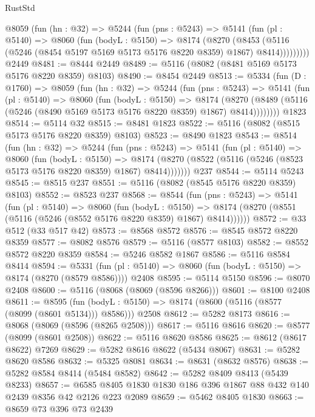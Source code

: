 \begin{lexlean}{RustStd}
\begin{coremodule}
{\begin{coremodule}
{{{{{{{{{{{{{{{{{{{{{{{{{{{{{{{      @8059
        (fun (hn : @32) =>
        @5244
          (fun (pns : @5243) =>
          @5141
            (fun (pl : @5140) =>
            @8060
              (fun (bodyL : @5150) =>
              @8174
                (@8270
                  (@8453
                    (@5116 (@5246 (@8454 @5197 @5169 @5173 @5176 @8220 @8359) @1867) @8414)))))))))
    @2449
@8481 := @8444 @2449
@8489 := @5116 (@8082 (@8481 @5169 @5173 @5176 @8220 @8359) @8103)
@8490 := @8454 @2449
@8513 := @5334
    (fun (D : @1760) =>
    @8059
      (fun (hn : @32) =>
      @5244
        (fun (pns : @5243) =>
        @5141
          (fun (pl : @5140) =>
          @8060
            (fun (bodyL : @5150) =>
            @8174
              (@8270 (@8489 (@5116 (@5246 (@8490 @5169 @5173 @5176 @8220 @8359) @1867) @8414))))))))
    @1823
@8514 := @5114 @32
@8515 := @8481 @1823
@8522 := @5116 (@8082 (@8515 @5173 @5176 @8220 @8359) @8103)
@8523 := @8490 @1823
@8543 := @8514
    (fun (hn : @32) =>
    @5244
      (fun (pns : @5243) =>
      @5141
        (fun (pl : @5140) =>
        @8060
          (fun (bodyL : @5150) =>
          @8174 (@8270 (@8522 (@5116 (@5246 (@8523 @5173 @5176 @8220 @8359) @1867) @8414)))))))
    @237
@8544 := @5114 @5243
@8545 := @8515 @237
@8551 := @5116 (@8082 (@8545 @5176 @8220 @8359) @8103)
@8552 := @8523 @237
@8568 := @8544
    (fun (pns : @5243) =>
    @5141
      (fun (pl : @5140) =>
      @8060
        (fun (bodyL : @5150) =>
        @8174 (@8270 (@8551 (@5116 (@5246 (@8552 @5176 @8220 @8359) @1867) @8414))))))
@8572 := @33 @512 (@33 @517 @42)
@8573 := @8568 @8572
@8576 := @8545 @8572 @8220 @8359
@8577 := @8082 @8576
@8579 := @5116 (@8577 @8103)
@8582 := @8552 @8572 @8220 @8359
@8584 := @5246 @8582 @1867
@8586 := @5116 @8584 @8414
@8594 := @5331
    (fun (pl : @5140) => @8060 (fun (bodyL : @5150) => @8174 (@8270 (@8579 @8586))))
    @2408
@8595 := @5114 @5150
@8596 := @8070 @2408
@8600 := @5116 (@8068 (@8069 (@8596 @8266)))
@8601 := @8100 @2408
@8611 := @8595
    (fun (bodyL : @5150) => @8174 (@8600 (@5116 (@8577 (@8099 (@8601 @5134))) @8586)))
    @2508
@8612 := @5282 @8173
@8616 := @8068 (@8069 (@8596 (@8265 @2508)))
@8617 := @5116 @8616
@8620 := @8577 (@8099 (@8601 @2508))
@8622 := @5116 @8620 @8586
@8625 := @8612 (@8617 @8622) @7269
@8629 := @5282 @8616 @8622 (@5434 @8067)
@8631 := @5282 @8620 @8586
@8632 := @5325 @8081
@8634 := @8631 (@8632 @8576)
@8638 := @5282 @8584 @8414 (@5484 @8582)
@8642 := @5282 @8409 @8413 (@5439 @8233)
@8657 := @6585 @8405 @1830 @1830 @186 @396 @1867 @88 @432 @140 @2439 @8356 @42 @2126 @223 @2089
@8659 := @5462 @8405 @1830
@8663 := @8659 @73 @396 @73 @2439
}}}}}}}}}}}}}}}}}}}}}}}}}}}}}}}
\end{coremodule}}
\end{coremodule}
\end{lexlean}
